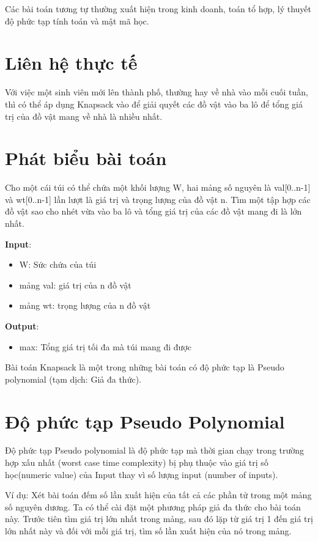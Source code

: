 \documentclass[12pt,a4paper]{report}
\begin{document}
    Các bài toán tương tự thường xuất hiện trong kinh doanh, toán tổ hợp, lý thuyết
    độ phức tạp tính toán và mật mã học.
    
    \section{Liên hệ thực tế}
    Với việc một sinh viên mới lên thành phố, thường hay về nhà vào mỗi cuối tuần, 
    thì có thể áp dụng Knapsack vào để giải quyết các đồ vật vào ba lô để tổng giá 
    trị của đồ vật mang về nhà là nhiều nhất. 
    \section{Phát biểu bài toán}
    Cho một cái túi có thể chứa một khối lượng W, hai mảng số nguyên là 
    val[0..n-1] và wt[0..n-1] lần lượt là giá trị và trọng lượng của đồ vật n.
    Tìm một tập hợp các đồ vật sao cho nhét vừa vào ba lô và tổng giá trị của
    các đồ vật mang đi là lớn nhất.
    
    \textbf{Input}:
    \begin{itemize}
        \item W: Sức chứa của túi
        \item mảng val: giá trị của n đồ vật
        \item mảng wt: trọng lượng của n đồ vật
    \end{itemize}
    \textbf{Output}:
    \begin{itemize}
        \item max: Tổng giá trị tối đa mà túi mang đi được
    \end{itemize}

    Bài toán Knapsack là một trong những bài toán có độ phức tạp là Pseudo polynomial
    (tạm dịch: Giả đa thức). 

    \section{Độ phức tạp Pseudo Polynomial}
    Độ phức tạp Pseudo polynomial là độ phức tạp mà thời
    gian chạy trong trường hợp xấu nhất (worst case time complexity) 
    bị phụ thuộc vào giá trị số học(numeric value) của Input thay vì số 
    lượng input (number of inputs).

    Ví dụ: Xét bài toán đếm số lần xuất hiện của tất cả các phần tử trong một
    mảng số nguyên dương. Ta có thể cài đặt một phương pháp giả đa thức cho 
    bài toán này. Trước tiên tìm giá trị lớn nhất trong mảng, sau đó lặp từ giá 
    trị 1 đến giá trị lớn nhất này và đối với mỗi giá trị, tìm số lần xuất hiện
    của nó trong mảng. 
\end{document}
